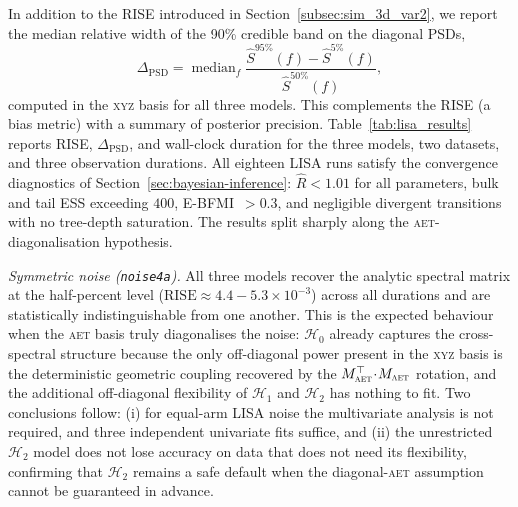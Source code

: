 \documentclass[%
	reprint,
	nofootinbib,
	amsmath,
	amssymb,
	aps,
]{revtex4-2}
\newcommand{\AET}{\textsc{aet}\xspace}
\newcommand{\XYZ}{\textsc{xyz}\xspace}
\begin{document}
	In addition to the RISE introduced in Section~\ref{subsec:sim_3d_var2},
	we report the median relative width of the 90\% credible band on the
	diagonal PSDs,
	\begin{equation}
		\label{eq:delta_psd}
		\Delta_{\mathrm{PSD}} = \operatorname{median}_{f}
		\frac{\hat{S}^{95\%}(f)-\hat{S}^{5\%}(f)}{\hat{S}^{50\%}(f)},
	\end{equation}
	computed in the \XYZ basis for all three models. This complements the RISE
	(a bias metric) with a summary of posterior precision.
	Table~\ref{tab:lisa_results} reports RISE, $\Delta_{\mathrm{PSD}}$, and
	wall-clock duration for the three models, two datasets, and three
	observation durations. All eighteen LISA runs satisfy the convergence
	diagnostics of
	Section~\ref{sec:bayesian-inference}: $\hat R<1.01$ for all parameters,
	bulk and tail ESS exceeding $400$, E-BFMI~$>0.3$, and negligible
	divergent transitions with no tree-depth saturation. The results split sharply
	along the \AET-diagonalisation hypothesis.

	\emph{Symmetric noise (\texttt{noise4a}).} All three models recover
	the analytic spectral matrix at the half-percent level
	($\mathrm{RISE}\approx 4.4\!-\!5.3\times10^{-3}$) across all
	durations and are statistically indistinguishable from one another.
	This is the expected behaviour when the \AET basis truly diagonalises
	the noise: $\mathcal{H}_{0}$ already captures the cross-spectral
	structure because the only off-diagonal power present in the \XYZ
	basis is the deterministic geometric coupling recovered by the
	$M_{\AET}^{\top}\!\cdot\!M_{\AET}$ rotation, and
	the additional off-diagonal flexibility of $\mathcal{H}_{1}$ and
	$\mathcal{H}_{2}$ has nothing to fit. Two conclusions follow:
	(i) for equal-arm LISA noise the multivariate analysis is not
	required, and three independent univariate fits suffice, and
	(ii) the unrestricted $\mathcal{H}_{2}$ model does not lose
	accuracy on data that does not need its flexibility, confirming
	that $\mathcal{H}_{2}$ remains a safe default when the
	diagonal-\AET assumption cannot be guaranteed in advance.
\end{document}
